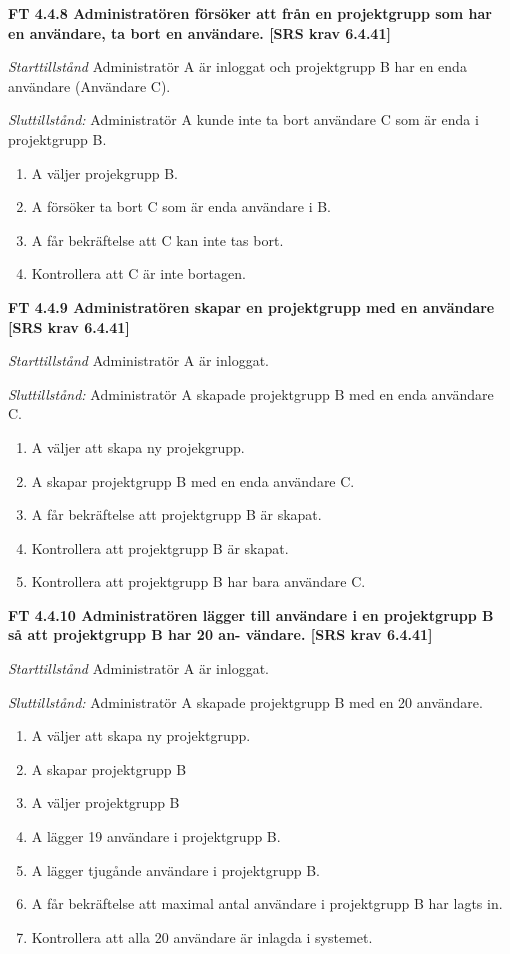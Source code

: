 \documentclass[a4paper]{article}
\begin{document}
\textbf{FT 4.4.8 Administratören försöker att från en projektgrupp som har en användare, ta bort en användare. [SRS krav 6.4.41]}

\emph{Starttillstånd} Administratör A är inloggat och projektgrupp B har en enda användare (Användare C).

\emph{Sluttillstånd:} Administratör A kunde inte ta bort användare C som är enda i  projektgrupp B.

\begin{enumerate}
\item A väljer projekgrupp B.
\item A försöker ta bort C som är enda användare i B.
\item A får bekräftelse att C kan inte tas bort.
\item Kontrollera att C är inte bortagen.
\end{enumerate}

\textbf{FT 4.4.9 Administratören skapar en projektgrupp med en användare [SRS krav 6.4.41]}

\emph{Starttillstånd} Administratör A är inloggat. 

\emph{Sluttillstånd:} Administratör A  skapade  projektgrupp B med en enda användare C.

\begin{enumerate}
\item A väljer att skapa ny projekgrupp.
\item A skapar projektgrupp B med en enda användare C.
\item A får bekräftelse att projektgrupp B är skapat.
\item Kontrollera att projektgrupp B är skapat.
\item Kontrollera att projektgrupp B har bara användare C.
\end{enumerate}

\textbf{FT 4.4.10 Administratören lägger till användare i en projektgrupp B så att projektgrupp B har 20 an- vändare. [SRS krav 6.4.41]}

\emph{Starttillstånd} Administratör A är inloggat.

\emph{Sluttillstånd:} Administratör A  skapade  projektgrupp B med en 20  användare.

\begin{enumerate}
\item A väljer att skapa ny projektgrupp.
\item A skapar projektgrupp B
\item A väljer projektgrupp B
\item A lägger 19 användare i projektgrupp B.
\item A lägger tjugånde användare i projektgrupp B.
\item A får bekräftelse att maximal antal användare i projektgrupp B har lagts in.
\item Kontrollera att alla 20 användare är inlagda i systemet.
\end{enumerate}
\end{document}
